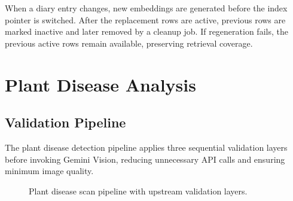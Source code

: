\documentclass[conference]{IEEEtran}
\begin{document}
When a diary entry changes, new embeddings are generated before the index pointer is switched. After the replacement rows are active, previous rows are marked inactive and later removed by a cleanup job. If regeneration fails, the previous active rows remain available, preserving retrieval coverage.

\section{Plant Disease Analysis}

\subsection{Validation Pipeline}

The plant disease detection pipeline applies three sequential validation layers before invoking Gemini Vision, reducing unnecessary API calls and ensuring minimum image quality.

\begin{figure}[htbp]
\centering
{}
\caption{Plant disease scan pipeline with upstream validation layers.}
\label{fig:scan}
\end{figure}
\end{document}
